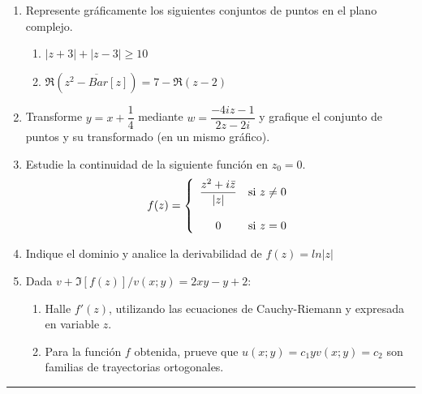 \documentclass[9pt,a4paper]{extarticle}
\begin{document}
\begin{enumerate}
    \item Represente gráficamente los siguientes conjuntos de puntos en el plano complejo.
    \begin{enumerate}
        \item $|z+3|+|z-3| \geq 10$
        \item $\Re(\overline{z^2-Bar[z]}) = 7-\Re(z-2)$
    \end{enumerate}
    \item Transforme $y=x+\dfrac{1}{4}$ mediante $w=\dfrac{-4iz-1}{2z-2i}$ y grafique el conjunto de puntos y su transformado (en un mismo gráfico).
    \item Estudie la continuidad de la siguiente función en $z_0=0$. $$
     f(z) = \left\{
	       \begin{array}{cc}
		 \dfrac{z^2+i\Bar{z}}{|z|}      & \mathrm{si\ } z \neq 0 \\
		 &\\
		 0     & \mathrm{si\ } z = 0
	       \end{array}
	     \right.
$$
\item Indique el dominio y analice la derivabilidad de $f(z) = ln |z|$
\item Dada $v + \Im[f(z)]/v(x;y)=2xy-y+2$:
\begin{enumerate}
    \item Halle $f'(z)$, utilizando las ecuaciones de Cauchy-Riemann y expresada en variable $z$.
    \item Para la función $f$ obtenida, prueve que $u(x;y)=c_1 y v(x;y)=c_2$ son familias de trayectorias ortogonales.
\end{enumerate}
\end{enumerate}
\hrule
\end{document}
